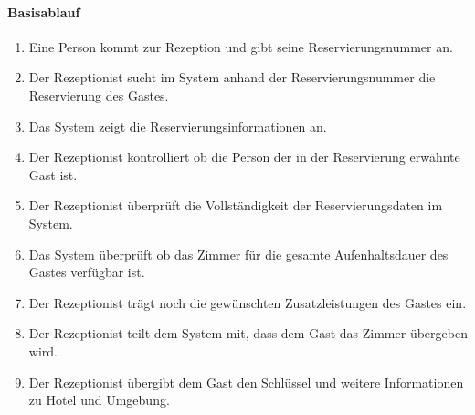 \paragraph{Basisablauf}
\begin{enumerate}
	\item Eine Person kommt zur \Gls{Rezeption} und gibt seine \Gls{Reservierungsnummer} an.
	\item Der \Gls{Rezeptionist} sucht im System anhand der \Gls{Reservierungsnummer} die Reservierung des \Gls{Gast}es.
	\item Das System zeigt die Reservierungsinformationen an.
	\item Der \Gls{Rezeptionist} kontrolliert ob die Person der in der \Gls{Reservierung} erwähnte \Gls{Gast} ist.
	\item Der \Gls{Rezeptionist} überprüft die Vollständigkeit der Reservierungsdaten im System.
	\item Das System überprüft ob das \Gls{Zimmer} für die gesamte Aufenhaltsdauer des \Gls{Gast}es verfügbar ist.
	\item Der \Gls{Rezeptionist} trägt noch die gewünschten \Gls{Zusatzleistung}en des \Gls{Gast}es ein.
	\item Der \Gls{Rezeptionist} teilt dem System mit, dass dem \Gls{Gast} das \Gls{Zimmer} übergeben wird.
	\item Der \Gls{Rezeptionist} übergibt dem \Gls{Gast} den Schlüssel und weitere Informationen zu Hotel und Umgebung.
\end{enumerate}

